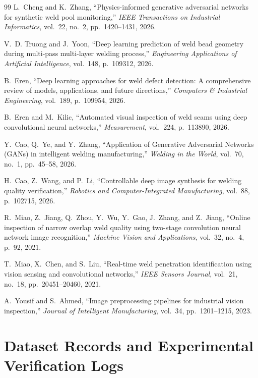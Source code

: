 \documentclass[12pt,a4paper,oneside]{report}
\begin{document}
\begin{thebibliography}{99}
L.~Cheng and K.~Zhang,
``Physics-informed generative adversarial networks for synthetic weld pool monitoring,''
\textit{IEEE Transactions on Industrial Informatics}, vol.~22, no.~2, pp.~1420--1431, 2026.

V.~D. Truong and J.~Yoon,
``Deep learning prediction of weld bead geometry during multi-pass multi-layer welding process,''
\textit{Engineering Applications of Artificial Intelligence}, vol.~148, p.~109312, 2026.

B.~Eren,
``Deep learning approaches for weld defect detection: A comprehensive review of models, applications, and future directions,''
\textit{Computers \& Industrial Engineering}, vol.~189, p.~109954, 2026.

B.~Eren and M.~Kilic,
``Automated visual inspection of weld seams using deep convolutional neural networks,''
\textit{Measurement}, vol.~224, p.~113890, 2026.

Y.~Cao, Q.~Ye, and Y.~Zhang,
``Application of Generative Adversarial Networks (GANs) in intelligent welding manufacturing,''
\textit{Welding in the World}, vol.~70, no.~1, pp.~45--58, 2026.

H.~Cao, Z.~Wang, and P.~Li,
``Controllable deep image synthesis for welding quality verification,''
\textit{Robotics and Computer-Integrated Manufacturing}, vol.~88, p.~102715, 2026.

R.~Miao, Z.~Jiang, Q.~Zhou, Y.~Wu, Y.~Gao, J.~Zhang, and Z.~Jiang,
``Online inspection of narrow overlap weld quality using two-stage convolution neural network image recognition,''
\textit{Machine Vision and Applications}, vol.~32, no.~4, p.~92, 2021.

T.~Miao, X.~Chen, and S.~Liu,
``Real-time weld penetration identification using vision sensing and convolutional networks,''
\textit{IEEE Sensors Journal}, vol.~21, no.~18, pp.~20451--20460, 2021.

A.~Yousif and S.~Ahmed,
``Image preprocessing pipelines for industrial vision inspection,''
\textit{Journal of Intelligent Manufacturing}, vol.~34, pp.~1201--1215, 2023.

\end{thebibliography}

\clearpage
\appendix
\chapter{Dataset Records and Experimental Verification Logs}
\label{app:dataset_logs}
\end{document}
